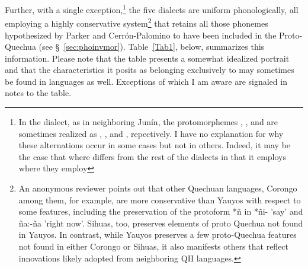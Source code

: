 Further, with a single exception,\footnote{In the \CH{} dialect, as in neighboring Jun\'in, the protomorphemes , , and   are sometimes realized as \textipa{[l]}, \textipa{[h]}, and \textipa{[sh]}, repectively. I have no explanation for why these alternations occur in some cases but not in others. Indeed, it may be the case that where \CH{} differs from the rest of the dialects in that it employs where they employ } the five dialects are uniform phonologically, all employing a highly conservative system\footnote{An anonymous reviewer points out that other Quechuan languages, Corongo among them, for example, are more conservative than Yauyos with respect to some features, including the preservation of the protoform *\~n in *\~ni- 'say' and \~na:-\~na 'right now'. Sihuas, too, preserves elements of proto Quechua not found in Yauyos. In contrast, while Yauyos preserves a few proto-Quechua features not found in either Corongo or Sihuas, it also manifests others that reflect innovations likely adopted from neighboring QII languages.} that retains all those phonemes hypothesized by Parker and Cerr\'on-Palomino to have been included in the Proto-Quechua (see \S~\ref{sec:phoinvmor}). Table~\ref{Tab1}, below, summarizes this information. Please note that the table presents a somewhat idealized portrait and that the characteristics it posits as belonging exclusively to \QII{} may sometimes be found in \QI{} languages as well. Exceptions of which I am aware are signaled in notes to the table.

